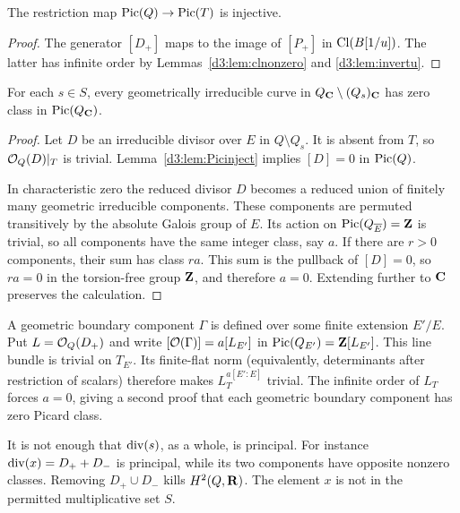 \begin{lemma}\label{d3:lem:Picinject}
The restriction map $\operatorname{Pic}(Q)\to\operatorname{Pic}(T)$ is injective.
\end{lemma}
\begin{proof}
The generator $[D_+]$ maps to the image of $[P_+]$ in $\operatorname{Cl}(B[1/u])$. The latter has infinite order by Lemmas~\ref{d3:lem:clnonzero} and \ref{d3:lem:invertu}.
\end{proof}

\begin{lemma}\label{d3:lem:components}
For each $s\in S$, every geometrically irreducible curve in $Q_{\mathbf C}\setminus(Q_s)_{\mathbf C}$ has zero class in $\operatorname{Pic}(Q_{\mathbf C})$.
\end{lemma}
\begin{proof}
Let $D$ be an irreducible divisor over $E$ in $Q\setminus Q_s$. It is absent from $T$, so $\mathcal O_Q(D)|_T$ is trivial. Lemma~\ref{d3:lem:Picinject} implies $[D]=0$ in $\operatorname{Pic}(Q)$.

In characteristic zero the reduced divisor $D$ becomes a reduced union of finitely many geometric irreducible components. These components are permuted transitively by the absolute Galois group of $E$. Its action on $\operatorname{Pic}(Q_{\overline E})=\mathbf Z$ is trivial, so all components have the same integer class, say $a$. If there are $r>0$ components, their sum has class $ra$. This sum is the pullback of $[D]=0$, so $ra=0$ in the torsion-free group $\mathbf Z$, and therefore $a=0$. Extending further to $\mathbf C$ preserves the calculation.
\end{proof}

\begin{remark}
A geometric boundary component $\Gamma$ is defined over some finite
extension $E'/E$. Put $L=\mathcal O_Q(D_+)$ and write
$[\mathcal O(\Gamma)]=a[L_{E'}]$ in $\operatorname{Pic}(Q_{E'})=\mathbf Z[L_{E'}]$.
This line bundle is trivial on $T_{E'}$. Its finite-flat norm
(equivalently, determinants after restriction of scalars) therefore
makes $L_T^{a[E':E]}$ trivial. The infinite order of $L_T$ forces
$a=0$, giving a second proof that each geometric boundary component has zero Picard class.
\end{remark}

\begin{remark}
It is not enough that $\operatorname{div}(s)$, as a whole, is principal. For instance $\operatorname{div}(x)=D_++D_-$ is principal, while its two components have opposite nonzero classes. Removing $D_+\cup D_-$ kills $H^2(Q,\mathbf R)$. The element $x$ is not in the permitted multiplicative set $S$.
\end{remark}

